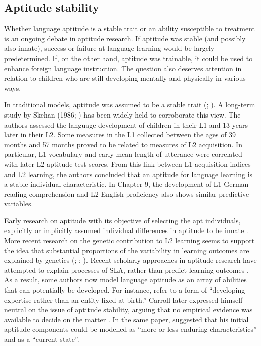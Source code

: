 \documentclass[output=paper]{langscibook}
\begin{document}
\subsection{Aptitude stability} %

Whether language aptitude is a stable trait or an ability susceptible to treatment is an ongoing debate in aptitude research. If aptitude was stable (and possibly also innate), success or failure at language learning would be largely predetermined. If, on the other hand, aptitude was trainable, it could be used to enhance foreign language instruction. The question also deserves attention in relation to children who are still developing mentally and physically in various ways. 

In traditional models, aptitude was assumed to be a stable trait (\citealt{Skehan1998}; \citealt{Singleton2017}). A long-term study by Skehan (1986; \citealt{SkehanDucroquet1988}) has been widely held to corroborate this view. The authors assessed the language development of children in their L1 and 13 years later in their L2. Some measures in the L1 collected between the ages of 39 months and 57 months proved to be related to measures of L2 acquisition. In particular, L1 vocabulary and early mean length of utterance were correlated with later L2 aptitude test scores. From this link between L1 acquisition indices and L2 learning, the authors concluded that an aptitude for language learning is a stable individual characteristic. In Chapter 9, the development of L1 German reading comprehension and L2 English proficiency also shows similar predictive variables. 

Early research on aptitude with its objective of selecting the apt individuals, explicitly or implicitly assumed individual differences in aptitude to be innate \parencites[122]{Carroll1964}[8]{Carroll1973}. More recent research on the genetic contribution to L2 learning seems to support the idea that substantial proportions of the variability in learning outcomes are explained by genetics (\citealt{Stromswold2001}; \citealt{RimfeldEtAl2015}; \citealt{Plomin2019}). Recent scholarly approaches in aptitude research have attempted to explain processes of SLA, rather than predict learning outcomes \citep{WenEtAl2019}. As a result, some authors now model language aptitude as an array of abilities that can potentially be developed. For instance, \citet[401]{GrigorenkoEtAl2000} refer to a form of “developing expertise rather than an entity fixed at birth.” Carroll later expressed himself neutral on the issue of aptitude stability, arguing that no empirical evidence was available to decide on the matter \citep[86]{Carroll1981}. In the same paper, \citet[84]{Carroll1981} suggested that his initial aptitude components could be modelled as “more or less enduring characteristics” and as a “current state”.
\end{document}
